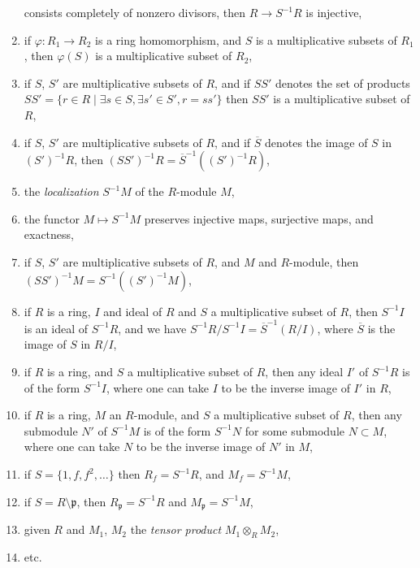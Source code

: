 \begin{enumerate}
consists completely of nonzero divisors, then $R \to S^{-1}R$
is injective,
\label{localize-nonzerodivisors}
\item if $\varphi : R_1 \to R_2$ is a ring homomorphism, and
$S$ is a multiplicative subsets of $R_1$, then $\varphi(S)$ is
a multiplicative subset of $R_2$,
\item if $S$, $S'$ are multiplicative subsets of $R$,
and if $SS'$ denotes the set of products $SS' =
\{r \in R \mid \exists s\in S, \exists s' \in S', r = ss'\}$
then $SS'$ is a multiplicative subset of $R$,
\label{products-multiplicative-subsets}
\item if $S$, $S'$ are multiplicative subsets of $R$,
and if $\overline{S}$ denotes the image of $S$ in $(S')^{-1}R$,
then $(SS')^{-1}R = \overline{S}^{-1}((S')^{-1}R)$,
\label{localization-localization}
\item the {\it localization} $S^{-1}M$ of the $R$-module $M$,
\label{localization-module}
\item the functor $M \mapsto S^{-1}M$ preserves injective maps,
surjective maps, and exactness,
\label{localization-exact}
\item if $S$, $S'$ are multiplicative subsets of $R$,
and $M$ and $R$-module, then $(SS')^{-1}M =
S^{-1}((S')^{-1}M)$,
\label{localization-localization-module}
\item if $R$ is a ring, $I$ and ideal of $R$ and $S$ a multiplicative
subset of $R$, then $S^{-1}I$ is an ideal of $S^{-1}R$, and we have
$S^{-1}R/S^{-1}I = \overline{S}^{-1}(R/I)$, where $\overline{S}$
is the image of $S$ in $R/I$,
\label{localize-ideal}
\item if $R$ is a ring, and $S$ a multiplicative
subset of $R$, then any ideal $I'$ of $S^{-1}R$ is
of the form $S^{-1}I$, where one can take $I$ to be
the inverse image of $I'$ in $R$,
\label{ideal-in-localization}
\item if $R$ is a ring, $M$ an $R$-module, and $S$ a multiplicative
subset of $R$, then any submodule $N'$ of $S^{-1}M$ is of the form
$S^{-1}N$ for some submodule $N \subset M$, where
one can take $N$ to be the inverse image of $N'$ in $M$,
\label{submodule-in-localization}
\item if $S = \{1, f, f^2,\ldots\}$ then $R_f = S^{-1}R$, and
$M_f = S^{-1}M$,
\label{localiza-f}
\item if $S = R \setminus \mathfrak p$, then $R_{\mathfrak p} = S^{-1}R$
and $M_{\mathfrak p} = S^{-1}M$,
\label{localize-p}
\item given $R$ and $M_1$, $M_2$ the {\it tensor product} 
$M_1 \otimes_R M_2$,
\item etc.
\end{enumerate}

